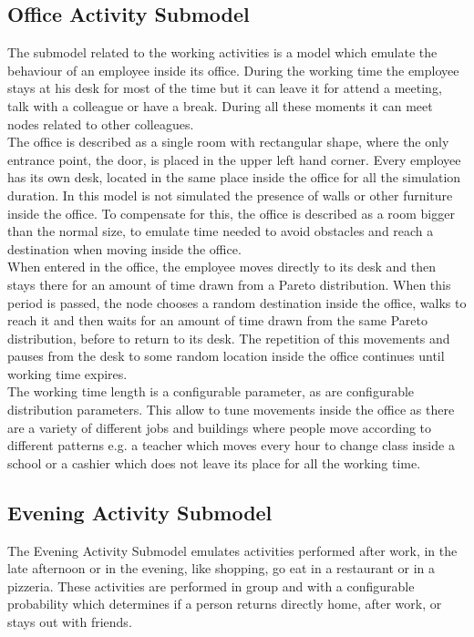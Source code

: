 \subsection{Office Activity Submodel}
The submodel related to the working activities is a model which emulate the behaviour of an employee inside its office. During the working time the employee stays at his desk for most of the time but it can leave it for attend a meeting, talk with a colleague or have a break. During all these moments it can meet nodes related to other colleagues.
\\

The office is described as a single room with rectangular shape, where the only entrance point, the door, is placed in the upper left hand corner. Every employee has its own desk, located in the same place inside the office for all the simulation duration. In this model is not simulated the presence of walls or other furniture inside the office. To compensate for this, the office is described as a room bigger than the normal size, to emulate time needed to avoid obstacles and reach a destination when moving inside the office.
\\

When entered in the office, the employee moves directly to its desk and then stays there for an amount of time drawn from a Pareto distribution. When this period is passed, the node chooses a random destination inside the office, walks to reach it and then waits for an amount of time drawn from the same Pareto distribution, before to return to its desk. The repetition of this movements and pauses from the desk to some random location inside the office continues until working time expires. 
\\

The working time length is a configurable parameter, as are configurable distribution parameters. This allow to tune movements inside the office as there are a variety of different jobs and buildings where people move according to different patterns e.g. a teacher which moves every hour to change class inside a school or a cashier which does not leave its place for all the working time.


\subsection{Evening Activity Submodel}
The Evening Activity Submodel emulates activities performed after work, in the late afternoon or in the evening, like shopping, go eat in a restaurant or in a pizzeria. These activities are performed in group and with a configurable probability which determines if a person returns directly home, after work, or stays out with friends.
\\

